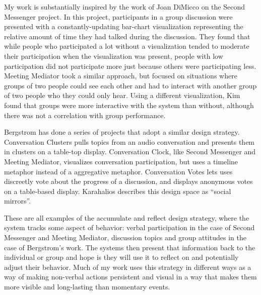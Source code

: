 \documentclass{tufte-handout}
\begin{document}
My work is substantially inspired by the work of Joan DiMicco on the Second Messenger project. \citep{DiMicco:2007ie} In this project, participants in a group discussion were presented with a constantly-updating bar-chart visualization representing the relative amount of time they had talked during the discussion. They found that while people who participated a lot without a visualization tended to moderate their participation when the visualization was present, people with low participation did not participate more just because others were participating less. Meeting Mediator \citep{Kim:2008ip} took a similar approach, but focused on situations where groups of two people could see each other and had to interact with another group of two people who they could only hear. Using a different visualization, Kim found that groups were more interactive with the system than without, although there was not a correlation with group performance. 


Bergstrom has done a series of projects that adopt a similar design strategy. Conversation Clusters pulls topics from an audio conversation and presents them in clusters on a table-top display. \citep{Bergstrom:2009fe} Conversation Clock, like Second Messenger and Meeting Mediator, visualizes conversation participation, but uses a timeline metaphor instead of a aggregative metaphor. \citep{Bergstrom:2007je} Conversation Votes lets uses discreetly vote about the progress of a discussion, and displays anonymous votes on a table-based display.\citep{Bergstrom:2009ej} Karahalios describes this design space as ``social mirrors''. \citep{Bergstrom:hu}


These are all examples of the accumulate and reflect design strategy, where the system tracks some aspect of behavior: verbal participation in the case of Second Messenger and Meeting Mediator, discussion topics and group attitudes in the case of Bergstrom's work. The systems then present that information back to the individual or group and hope is they will use it to reflect on and potentially adjust their behavior. Much of my work uses this strategy in different ways as a way of making non-verbal actions persistent and visual in a way that makes them more visible and long-lasting than momentary events.  



\end{document}

